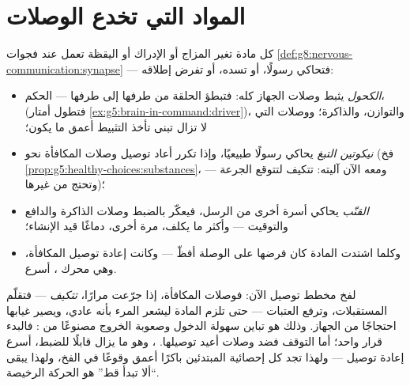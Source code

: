 \section{المواد التي تخدع الوصلات}

\begin{proposition}\label{prop:g8:protecting-the-nervous-system:substances}
كل مادة تغير المزاج أو الإدراك أو اليقظة تعمل عند فجوات
\cref{def:g8:nervous-communication:synapse} --- فتحاكي
رسولًا، أو تسده، أو تفرض إطلاقه:
\begin{itemize}
  \item \emph{الكحول} يثبط وصلات الجهاز كله: فتبطؤ
        الحلقة من طرفها إلى طرفها --- الحكم،  (فتطول أمتار
        \cref{ex:g5:brain-in-command:driver})، والتوازن،
        والذاكرة؛ ووصلات   التي لا تزال
        تبنى تأخذ التثبيط أعمق ما يكون؛
  \item \emph{نيكوتين التبغ} يحاكي رسولًا طبيعيًا، وإذا
        تكرر أعاد توصيل وصلات المكافأة نحو
        \emph{} (فخ
        \cref{prop:g5:healthy-choices:substances}، ومعه
        الآن آليته:  تتكيف لتتوقع الجرعة ---
        وتحتج من غيرها)؛
  \item \emph{القنّب} يحاكي أسرة أخرى من الرسل، فيعكّر
        بالضبط وصلات الذاكرة والدافع والتوقيت --- وأكثر
        ما يكلف، مرة أخرى، دماغًا قيد الإنشاء؛
  \item وكلما اشتدت المادة كان فرضها على الوصلة أفظّ ---
        وكانت إعادة توصيل المكافأة، وهي محرك ،
        أسرع.
\end{itemize}
\end{proposition}
\admitted

\begin{remark}\label{rem:g8:protecting-the-nervous-system:addiction}
لفخ  مخطط توصيل الآن:
فوصلات المكافأة، إذا جرّعت مرارًا، \emph{تتكيف} ---
فتقلّم المستقبلات، وترفع العتبات --- حتى تلزم المادة
ليشعر المرء بأنه عادي، ويصير غيابها احتجاجًا من الجهاز.
وذلك  هو تباين سهولة الدخول وصعوبة الخروج مصنوعًا
من : فالبدء قرار واحد؛ أما التوقف فضد وصلات أعيد
توصيلها.  ، وهو ما يزال قابلًا للضبط، أسرع
إعادة توصيل --- ولهذا تجد كل إحصائية المبتدئين باكرًا
أعمق وقوعًا في الفخ، ولهذا يبقى ``ألا تبدأ قط'' هو
الحركة الرخيصة.
\end{remark}

